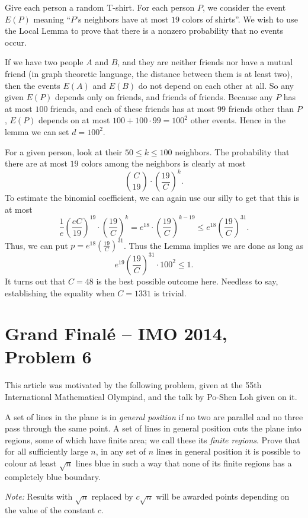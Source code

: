 \documentclass[11pt]{scrartcl}
\begin{document}
\begin{soln}
  Give each person a random T-shirt.
  For each person $P$, we consider the event $E(P)$ meaning ``$P$'s neighbors have at most $19$ colors of shirts''.
  We wish to use the Local Lemma to prove that there is a nonzero probability that no events occur.

  If we have two people $A$ and $B$, and they are neither friends nor have a mutual friend (in graph theoretic language,
  the distance between them is at least two), then the events $E(A)$ and $E(B)$ do not depend on each other at all.
  So any given $E(P)$ depends only on friends, and friends of friends.
  Because any $P$ has at most $100$ friends, and each of these friends has at most $99$ friends other than $P$,
  $E(P)$ depends on at most $100 + 100 \cdot 99 = 100^2$ other events.
  Hence in the lemma we can set $d = 100^2$.

  For a given person, look at their $50 \le k \le 100$ neighbors.
  The probability that there are at most $19$ colors among the neighbors is clearly at most
  \[ \binom{C}{19} \cdot \left( \frac{19}{C} \right)^k. \]
  To estimate the binomial coefficient, we can again use our silly  to get that this is at most
  \[ \frac 1e \left( \frac{eC}{19} \right)^{19}
    \cdot \left( \frac{19}{C} \right)^k
    = e^{18} \cdot \left( \frac{19}{C} \right)^{k-19}
    \le e^{18} \left( \frac{19}{C} \right)^{31}. \]
  Thus, we can put $p = e^{18} \left( \frac{19}{C} \right)^{31}$.
  Thus the Lemma implies we are done as long as
  \[ e^{19} \left( \frac{19}{C} \right)^{31} \cdot 100^2 \le 1. \]
  It turns out that $C=48$ is the best possible outcome here.
  Needless to say, establishing the equality when $C = 1331$ is trivial.
\end{soln}





\section{Grand Final\'e -- IMO 2014, Problem 6}
This article was motivated by the following problem,
given at the 55th International Mathematical Olympiad,
and the talk by Po-Shen Loh \cite{potalk} given on it.
\begin{example}
  [IMO 2014/6]
  A set of lines in the plane is in \emph{general position} if no two are parallel and no three pass through the same point.
  A set of lines in general position cuts the plane into regions, some of which have finite area; we call these its \emph{finite regions}.
  Prove that for all sufficiently large $n$,
  in any set of $n$ lines in general position it is possible to colour at least $\sqrt{n}$ lines blue
  in such a way that none of its finite regions has a completely blue boundary.

  \emph{Note:} Results with $\sqrt{n}$ replaced by $c\sqrt{n}$ will be awarded points depending on the value of the constant $c$.
\end{example}
\end{document}
